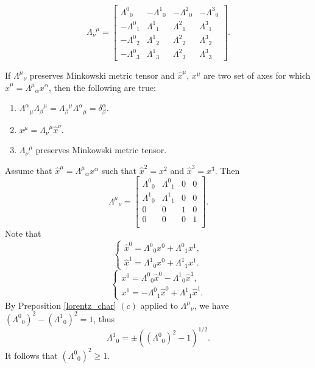 \documentclass[main.tex]{subfiles}
\begin{document}
\begin{definition}
$$
{\Lambda_\nu}^\mu = 
\begin{bmatrix}
    {\Lambda^0}_0 & -{\Lambda^1}_0 & -{\Lambda^2}_0 & -{\Lambda^3}_0 \\
    -{\Lambda^0}_1 & {\Lambda^1}_1 & {\Lambda^2}_1 & {\Lambda^3}_1 \\
    -{\Lambda^0}_2 & {\Lambda^1}_2 & {\Lambda^2}_2 & {\Lambda^3}_2 \\
    -{\Lambda^0}_3 & {\Lambda^1}_3 & {\Lambda^2}_3 & {\Lambda^3}_3
\end{bmatrix}.
$$
\end{definition}
\begin{proposition}
If  ${\Lambda^\mu}_\nu$ preserves Minkowski metric tensor and $\hat{x}^\mu$, $x^\mu$ are two set of axes for which $\hat{x}^\mu = {\Lambda^\mu}_\alpha x^\alpha$, then the following are true:
\begin{enumerate}
    \item  ${\Lambda^\alpha}_\mu {\Lambda_\beta}^\mu =  {\Lambda_\beta}^\mu {\Lambda^\alpha}_\mu = \delta^\alpha_\beta.$
    \item $x^\mu = {\Lambda_\nu}^\mu \hat{x}^\nu$.
    \item ${\Lambda_\nu}^\mu$ preserves Minkowski metric tensor.
\end{enumerate}
\end{proposition}
\noindent
Assume that  $\hat{x}^\mu = {\Lambda^\mu}_\alpha x^\alpha$ such that $\hat{x}^2 = x^2$ and $\hat{x}^3 = x^3$.
Then 
\begin{equation}
    {\Lambda^\mu}_\nu =
    \begin{bmatrix}
    {\Lambda^0}_0 & {\Lambda^0}_1 & 0 & 0 \\
    {\Lambda^1}_0 & {\Lambda^1}_1 & 0 & 0 \\
    0 & 0 & 1 & 0 \\
    0 & 0 & 0 & 1 \\
\end{bmatrix}.
\end{equation}
Note that 
\begin{equation}
\begin{cases}
    \hat{x}^0 = {\Lambda^0}_0 x^0 + {\Lambda^0}_1 x^1, \\
    \hat{x}^1 = {\Lambda^1}_0 x^0 + {\Lambda^1}_1 x^1.
\end{cases}
\end{equation}
\begin{equation}
\begin{cases}
    x^0 = {\Lambda^0}_0 \hat{x}^0 - {\Lambda^1}_0 \hat{x}^1, \\
    x^1 = -{\Lambda^0}_1 \hat{x}^0 + {\Lambda^1}_1 \hat{x}^1.
\end{cases}
\end{equation}
By Preposition \ref{lorentz_char} $(c)$ applied to ${\Lambda^\mu}_\nu$, we have 
$({\Lambda^0}_0)^2 - ({\Lambda^1}_0)^2 = 1$, thus
\begin{equation}
    {\Lambda^1}_0 = \pm (({\Lambda^0}_0)^2 - 1)^{1/2}.
\end{equation}
It follows that $({\Lambda^0}_0)^2 \geq 1$.
\end{document}
